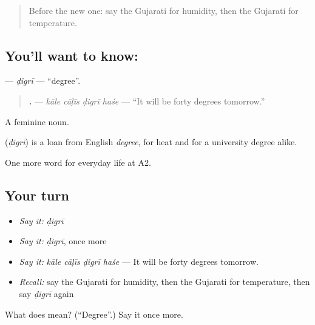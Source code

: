 \label{lesson:GU-C216-digri}



\begin{quote}
Before the new one: say the Gujarati for humidity, then the Gujarati for temperature.
\end{quote}

\subsection*{You'll want to know: }
\textbf{} — \emph{ḍigrī} — \textquotedblleft{}degree\textquotedblright{}.

\begin{quote}
\textbf{   .} — \emph{kāle cāḷīs ḍigrī haśe} — \textquotedblleft{}It will be forty degrees tomorrow.\textquotedblright{}
\end{quote}

A feminine noun.

\begin{cousinweb}
\textbf{} (\emph{ḍigrī}) is a loan from English \emph{degree}, for heat and for a university degree alike.
\end{cousinweb}

\begin{grammarlens}[title={What you've built}]
One more word for everyday life at A2.
\end{grammarlens}

\subsection*{Your turn}
\begin{itemize}
\raggedright
  \item \emph{Say it:} \emph{ḍigrī}
  \item \emph{Say it:} \emph{ḍigrī}, once more
  \item \emph{Say it:} \emph{kāle cāḷīs ḍigrī haśe} — It will be forty degrees tomorrow.
  \item \emph{Recall:} say the Gujarati for humidity, then the Gujarati for temperature, then say \emph{ḍigrī} again
\end{itemize}

\begin{tcolorbox}[breakable,colback=teal!4,colframe=teal!35!black,title={Before you move on}]
What does  mean? (\textquotedblleft{}Degree\textquotedblright{}.) Say it once more.
\end{tcolorbox}
